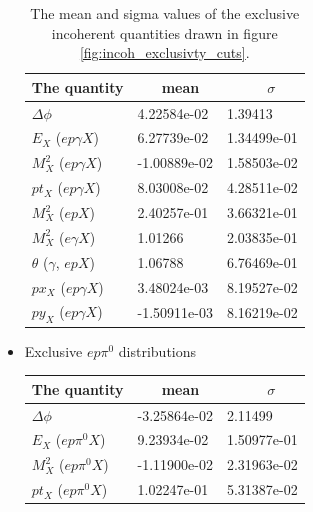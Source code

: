 \begin{itemize}
\begin {table}[!h]
\begin{center}
\begin{tabular}{|l|l|l|}
\hline
The quantity &  ~~~mean & ~~~~~$\sigma$ \\
\hline
$\Delta \phi$ &  4.22584e-02 & 1.39413 \\
\hline
$E_{X}$ ($ep\gamma X$) &  6.27739e-02 & 1.34499e-01 \\
\hline
$M^{2}_{X}$ ($ep\gamma X$) &  -1.00889e-02 & 1.58503e-02 \\ 
\hline
$pt_{X}$ ($ep\gamma X$) & 8.03008e-02 & 4.28511e-02 \\  
\hline
$M^{2}_{X}$ ($epX$) &  2.40257e-01 & 3.66321e-01 \\
\hline
$M^{2}_{X}$ ($e\gamma X$) &  1.01266 & 2.03835e-01 \\
\hline
$\theta$ ($\gamma$, $epX$) &  1.06788 & 6.76469e-01 \\
\hline
$px_{X}$ ($ep\gamma X$) & 3.48024e-03  &  8.19527e-02\\
\hline
$py_{X}$ ($ep\gamma X$) & -1.50911e-03 & 8.16219e-02\\
\hline
\end{tabular}
\caption{ The mean and sigma values of the exclusive incoherent quantities drawn in figure \ref{fig:incoh_exclusivty_cuts}.}
\label{Table:incoh_exclusivity_cuts}
\end{center}
\end{table}


\item Exclusive $ep\pi^{0}$ distributions
\begin {table}[!h]
\begin{center}
\begin{tabular}{|l|l|l|}
\hline
The quantity &  ~~~mean & ~~~~~$\sigma$  \\
\hline
$\Delta \phi$ & -3.25864e-02  & 2.11499 \\ 
  
\hline
$E_{X}$ ($ep\pi^{0} X$) &  9.23934e-02 & 1.50977e-01 \\
  
\hline
$M^{2}_{X}$ ($ep\pi^{0} X$) &  -1.11900e-02 & 2.31963e-02 \\
  
\hline
$pt_{X}$ ($ep\pi^{0} X$) & 1.02247e-01 & 5.31387e-02 \\
  

\end{tabular}
\end{center}
\end{table}
\end{itemize}
